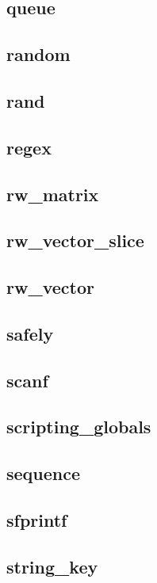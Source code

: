 \subsection{queue}						
\subsection{random}						
\subsection{rand}						
\subsection{regex}						
\subsection{rw\_matrix}						
\subsection{rw\_vector\_slice}					
\subsection{rw\_vector}						
\subsection{safely}						
\subsection{scanf}						
\subsection{scripting\_globals}					
\subsection{sequence}						
\subsection{sfprintf}						
\subsection{string\_key}					
